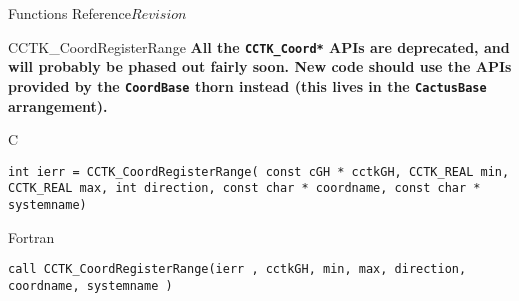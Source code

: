 \begin{cactuspart}{ Functions Reference}{}{$Revision$}
\begin{FunctionDescription}{CCTK\_CoordRegisterRange}
{\textbf{All the \texttt{CCTK\_Coord*} APIs are deprecated,
and will probably be phased out fairly soon.
New code should use the APIs provided by the \texttt{CoordBase} thorn
instead (this lives in the \texttt{CactusBase} arrangement).}
}
\label{CCTK-CoordRegisterRange}
\begin{SynopsisSection}
\begin{Synopsis}{C}
\begin{verbatim}int ierr = CCTK_CoordRegisterRange( const cGH * cctkGH, CCTK_REAL min, CCTK_REAL max, int direction, const char * coordname, const char * systemname)\end{verbatim}
\end{Synopsis}
\begin{Synopsis}{Fortran}
\begin{verbatim}call CCTK_CoordRegisterRange(ierr , cctkGH, min, max, direction, coordname, systemname )


\end{verbatim}
\end{Synopsis}
\end{SynopsisSection}
\end{FunctionDescription}
\end{cactuspart}
